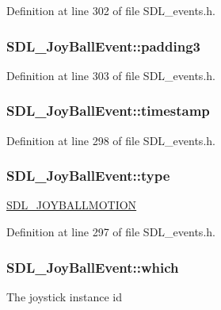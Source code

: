 Definition at line 302 of file S\-D\-L\-\_\-events.\-h.

\hypertarget{struct_s_d_l___joy_ball_event_acb700712f1a4070bc114ef9d55b00640}{
\subsubsection[{padding3}]{ S\-D\-L\-\_\-\-Joy\-Ball\-Event\-::padding3}}\label{struct_s_d_l___joy_ball_event_acb700712f1a4070bc114ef9d55b00640}


Definition at line 303 of file S\-D\-L\-\_\-events.\-h.

\hypertarget{struct_s_d_l___joy_ball_event_aa8e4fb91af62e316bb9a3219ab76148d}{
\subsubsection[{timestamp}]{ S\-D\-L\-\_\-\-Joy\-Ball\-Event\-::timestamp}}\label{struct_s_d_l___joy_ball_event_aa8e4fb91af62e316bb9a3219ab76148d}


Definition at line 298 of file S\-D\-L\-\_\-events.\-h.

\hypertarget{struct_s_d_l___joy_ball_event_a0b192b95a043cb494b27ed9b27e84db1}{
\subsubsection[{type}]{ S\-D\-L\-\_\-\-Joy\-Ball\-Event\-::type}}\label{struct_s_d_l___joy_ball_event_a0b192b95a043cb494b27ed9b27e84db1}
\hyperlink{_s_d_l__events_8h_a3b589e89be6b35c02e0dd34a55f3fccaa78f859489cfd565c305c7f6f9d5b25c1}{S\-D\-L\-\_\-\-J\-O\-Y\-B\-A\-L\-L\-M\-O\-T\-I\-O\-N} 

Definition at line 297 of file S\-D\-L\-\_\-events.\-h.

\hypertarget{struct_s_d_l___joy_ball_event_a4e2e185717d529167cd0bea21093c454}{
\subsubsection[{which}]{ S\-D\-L\-\_\-\-Joy\-Ball\-Event\-::which}}\label{struct_s_d_l___joy_ball_event_a4e2e185717d529167cd0bea21093c454}
The joystick instance id 

